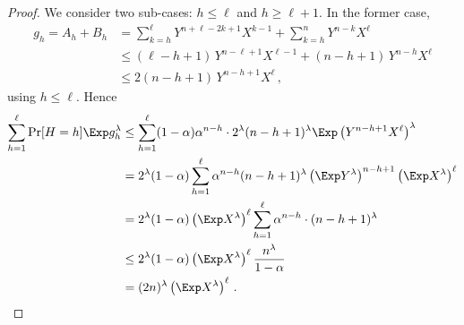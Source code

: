 \begin{proof}
We consider two sub-cases: $h \leq \ell$ and $h \geq \ell + 1$.
In the former case,
\begin{align*}
    g_h = A_h + B_h 
    &= \sum_{k=h}^\ell Y^{n+\ell - 2k + 1}X^{k-1} + \sum_{k=h}^n Y^{n-k} X^\ell    \\
    &\leq (\ell - h + 1)\, Y^{n-\ell+1} X^{\ell - 1} + (n-h+1)\, Y^{n-h} X^\ell \\
    &\leq 2 (n - h + 1)\, Y^{n-h + 1} X^\ell\,,
\end{align*}
using $h \leq \ell$. 
Hence
\begin{align*}
        \sum_{h = 1}^\ell \Pr[H = h] \Exp g_h^\lambda 
        &\leq \sum_{h=1}^\ell 
            (1-\alpha)\alpha^{n-h}\cdot 
            2^\lambda 
            (n-h+1)^\lambda 
            \Exp\left( Y^{n-h+1} X^\ell \right)^\lambda \\
        &= 2^\lambda (1-\alpha) \sum_{h=1}^\ell 
            \alpha^{n-h} 
            (n-h+1)^\lambda 
            \left(\Exp Y^\lambda \right)^{n-h+1} 
            \left(\Exp X^\lambda\right)^\ell \\
        &= 2^\lambda (1-\alpha) \left(\Exp X^\lambda\right)^\ell \sum_{h=1}^\ell \alpha^{n-h}\cdot (n-h+1)^\lambda \\
        &\leq 2^\lambda (1-\alpha) \left(\Exp X^\lambda\right)^\ell \frac{n^\lambda}{1-\alpha} \\
        &= (2n)^\lambda \left(\Exp X^\lambda\right)^\ell
        \,.
\end{align*}


\end{proof}
